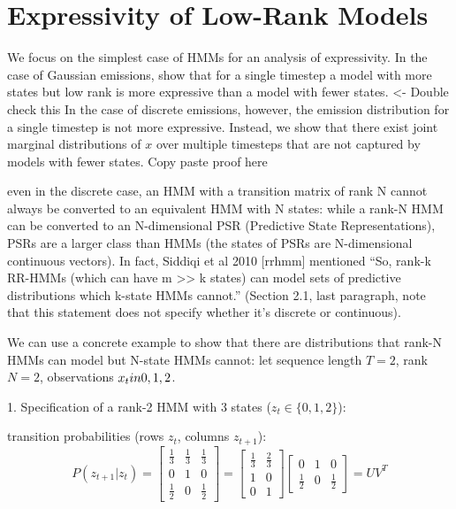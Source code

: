 \documentclass{article}
\begin{document}
\section{\label{sec:expressivity}Expressivity of Low-Rank Models}
We focus on the simplest case of HMMs for an analysis of expressivity.
In the case of Gaussian emissions, \citet{rrhmm} show that for a single timestep a model with more states but low rank is more expressive than a model with fewer states. {\color{red}<- Double check this}
In the case of discrete emissions, however, the emission distribution for a single timestep is not more expressive. Instead, we show that there exist joint marginal distributions of $x$ over multiple timesteps that are not captured by models with fewer states.
{\color{red}Copy paste proof here}

even in the discrete case, an HMM with a transition matrix of rank N cannot always be converted to an equivalent HMM with N states: while a rank-N HMM can be converted to an N-dimensional PSR (Predictive State Representations), PSRs are a larger class than HMMs (the states of PSRs are N-dimensional continuous vectors). In fact, Siddiqi et al 2010 [rrhmm] mentioned “So, rank-k RR-HMMs (which can have m >> k states) can model sets of predictive distributions which k-state HMMs cannot.” (Section 2.1, last paragraph, note that this statement does not specify whether it's discrete or continuous).

We can use a concrete example to show that there are distributions that rank-N HMMs can model but N-state HMMs cannot: let sequence length $T=2$, rank $N=2$, observations $x_t\\in\\{0, 1, 2\\}$.

1. Specification of a rank-2 HMM with 3 states ($z_t\in \{0,1,2\}$):

transition probabilities (rows $z_t$, columns $z_{t+1}$):
$$
P(z_{t+1} |z_{t})
= \begin{bmatrix}
    \frac{1}{3} & \frac{1}{3} & \frac{1}{3} \\
    0 & 1 & 0 \\
    \frac{1}{2} & 0 & \frac{1}{2}
\end{bmatrix}
=  \begin{bmatrix}
    \frac{1}{3} & \frac{2}{3} \\
    1 & 0 \\
    0 & 1
\end{bmatrix}
\begin{bmatrix}
    0 & 1 & 0 \\
    \frac{1}{2} & 0 & \frac{1}{2}
\end{bmatrix} = UV^T
$$
\end{document}
